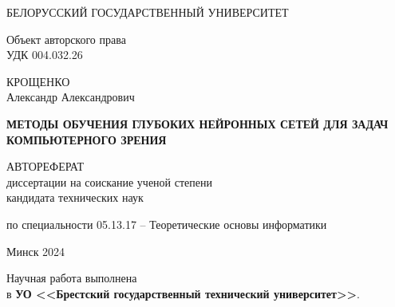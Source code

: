\documentclass{thesisby}
\begin{document}
\thispagestyle{empty}

\begin{center} 

\bfseries
\medskip

{БЕЛОРУССКИЙ ГОСУДАРСТВЕННЫЙ УНИВЕРСИТЕТ}


\vspace{2cm}
\end{center}

\noindent Объект авторского права\\
\noindent УДК 004.032.26 \\[5mm]

\begin{center}

{КРОЩЕНКО \\ Александр Александрович}\\

\vspace{1cm}

{\bfseries МЕТОДЫ ОБУЧЕНИЯ ГЛУБОКИХ НЕЙРОННЫХ СЕТЕЙ 
ДЛЯ ЗАДАЧ КОМПЬЮТЕРНОГО ЗРЕНИЯ}\\ \vspace{2cm}

АВТОРЕФЕРАТ\\ диссертации на соискание ученой степени\\
кандидата технических наук\\
\medskip



    
\vspace{1cm}
по специальности 05.13.17 -- Теоретические основы информатики 

\vspace*{\fill}


Минск 2024
\end{center}


\newpage

\thispagestyle{empty} 

\noindent Научная работа выполнена\\ в \textbf{УО <<Брестский государственный технический университет>>}.

\vspace*{\fill} 

 
\end{document}
